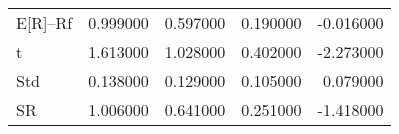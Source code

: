 \begin{tabular}{lrrrr}
\toprule
\midrule
E[R]--Rf & 0.999000 & 0.597000 & 0.190000 & -0.016000 \\
t & 1.613000 & 1.028000 & 0.402000 & -2.273000 \\
Std & 0.138000 & 0.129000 & 0.105000 & 0.079000 \\
SR & 1.006000 & 0.641000 & 0.251000 & -1.418000 \\
\bottomrule
\end{tabular}
